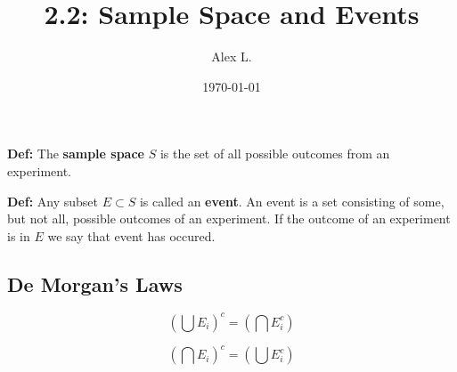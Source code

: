 \documentclass{article}
\title{2.2: Sample Space and Events}
\author{Alex L.}
\date{\today}
\begin{document}
\maketitle

\textbf{Def:} The \textbf{sample space} $S$ is the set of all possible outcomes from an experiment. 

\textbf{Def:} Any subset $E \subset S$ is called an \textbf{event}. An event is a set consisting of some, but not all, possible outcomes of an experiment. If the outcome of an experiment is in $E$ we say that event has occured.

\subsection{De Morgan's Laws}

$$(\bigcup E_i)^c = (\bigcap E_i^c)$$

$$(\bigcap E_i)^c = (\bigcup E_i^c)$$
\end{document}
